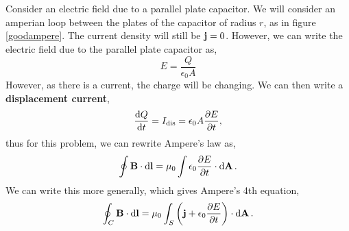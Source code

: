 \documentclass{book}
\begin{document}
\\\\
Consider an electric field due to a parallel plate capacitor. We will consider an amperian loop between the plates of the capacitor of radius $r$, as in figure \ref{goodampere}. The current density will still be $\vb{j} = 0$. However, we can write the electric field due to the parallel plate capacitor as,
\begin{equation}
	E = \frac{Q}{\epsilon_0 A}
\end{equation}
However, as there is a current, the charge will be changing. We can then write a \textbf{displacement current},
\begin{equation}
	\dv{Q}{t} = I_{\text{dis}} = \epsilon_0A\pdv{E}{t},
\end{equation}
thus for this problem, we can rewrite Ampere's law as,
\begin{equation}
	\oint \vb{B}\cdot\dd{\vb{l}} = \mu_0\int \epsilon_0 \pdv{E}{t}\cdot\dd{\vb{A}}.
\end{equation}
We can write this more generally, which gives Ampere's 4th equation,
\begin{equation}
	\oint_C \vb{B}\cdot \dd{\vb{l}} = \mu_0 \int_S \left(\vb{j} + \epsilon_0 \pdv{E}{t}\right)\cdot\dd{\vb{A}}.
\end{equation}
\end{document}
